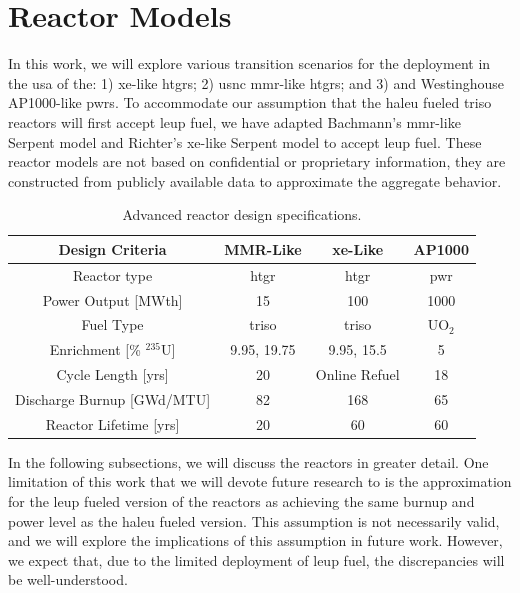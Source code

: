 \section{Reactor Models}
\label{sec:reactor_models}

In this work, we will explore various transition scenarios for the deployment in the \gls{usa} of the: 1) \gls{xe}-like \glspl{htgr}; 2) \gls{usnc} \gls{mmr}-like \glspl{htgr}; and 3) and Westinghouse AP1000-like \glspl{pwr}. To accommodate our assumption that the \gls{haleu} fueled \gls{triso} reactors will first accept \gls{leup} fuel, we have adapted Bachmann's \gls{mmr}-like Serpent model \cite{bachmann_mmr_like_2023} and Richter's \gls{xe}-like Serpent model \cite{richter_xe100_like} to accept \gls{leup} fuel. These reactor models are not based on confidential or proprietary information, they are constructed from publicly available data to approximate the aggregate behavior.

\begin{table}[!htbp]
   \centering
   \caption{Advanced reactor design specifications.}
   \label{tab:ar_defs}
   \begin{tabular}{c c c c}
      \hline
      \textbf{Design Criteria} & \textbf{MMR-Like} \cite{usnc_design_2021} & \textbf{\gls{xe}-Like} \cite{nuscale_chapter_2018} & \textbf{AP1000} \\
      \hline
      Reactor type & \gls{htgr} & \gls{htgr} & \gls{pwr} \\
      Power Output [MWth] & 15 & 100 & 1000 \\
      Fuel Type & \gls{triso} & \gls{triso} & UO$_2$ \\
      Enrichment [\% $^{235}$U] & 9.95, 19.75 & 9.95, 15.5 & 5 \\
      Cycle Length [yrs] & 20 & Online Refuel & 18 \\
      Discharge Burnup [GWd/MTU] & 82 & 168 & 65 \\
      Reactor Lifetime [yrs] & 20 & 60 & 60 \\
      \hline
   \end{tabular}
\end{table}

In the following subsections, we will discuss the reactors in greater detail. One limitation of this work that we will devote future research to is the approximation for the \gls{leup} fueled version of the reactors as achieving the same burnup and power level as the \gls{haleu} fueled version. This assumption is not necessarily valid, and we will explore the implications of this assumption in future work. However, we expect that, due to the limited deployment of \gls{leup} fuel, the discrepancies will be well-understood.

